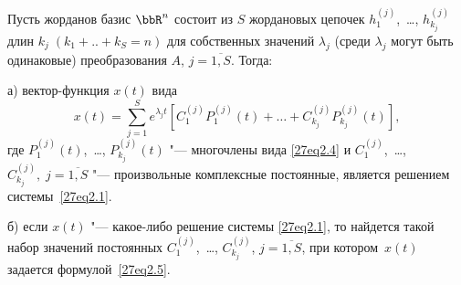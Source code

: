 \begin{thm}\label{27thm2}
Пусть жорданов базис $\bbR^n$ состоит из $S$ жордановых цепочек $h_1^{(j)}$,~\dots, $h_{k_j}^{(j)}$ длин $k_j\; (k_1+..+k_S=n)$ для собственных значений $\lambda_j$ (среди $\lambda_j$ могут быть одинаковые) преобразования $A$, $j=\overline{1,S}$. Тогда:

а) вектор-функция $x(t)$ вида
\begin{equation}\label{27eq2.5}
x(t)=\sum\limits_{j=1}^S e^{\lambda_j t}\left[C_1^{(j)}P_1^{(j)}(t)+\ldots+C_{k_j}^{(j)}P_{k_j}^{(j)}(t)\right],
\end{equation}
где $P_1^{(j)}(t)$,~\dots, $P_{k_j}^{(j)}(t)$ "--- многочлены вида \eqref{27eq2.4} и $C_1^{(j)}$,~\dots, $C_{k_j}^{(j)},\; j=\overline{1,S}$ "--- произвольные комплексные постоянные, является решением системы~\eqref{27eq2.1}.

б) если $x(t)$ "--- какое-либо решение системы \eqref{27eq2.1}, то найдется такой набор значений постоянных $C_1^{(j)}$,~\dots, $C_{k_j}^{(j)}$, $j=\overline{1,S}$, при котором~$x(t)$ задается формулой~\eqref{27eq2.5}.
\end{thm}
